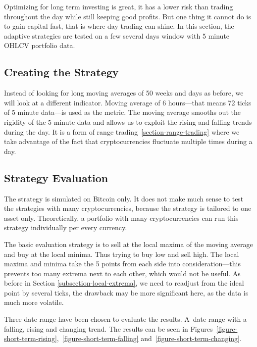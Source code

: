 Optimizing for long term investing is great, it has a lower risk than trading throughout the day while still keeping good profits. But one thing it cannot do is to gain capital fast, that is where day trading can shine. In this section, the adaptive strategies are tested on a few several days window with 5 minute OHLCV portfolio data.

\subsection*{Creating the Strategy}
Instead of looking for long moving averages of 50 weeks and days as before, we will look at a different indicator. Moving average of 6 hours---that means 72 ticks of 5 minute data---is used as the metric. The moving average smooths out the rigidity of the 5-minute data and allows us to exploit the rising and falling trends during the day. It is a form of range trading~\ref{section-range-trading} where we take advantage of the fact that cryptocurrencies fluctuate multiple times during a day.

\subsection*{Strategy Evaluation}
The strategy is simulated on Bitcoin only. It does not make much sense to test the strategies with many cryptocurrencies, because the strategy is tailored to one asset only. Theoretically, a portfolio with many cryptocurrencies can run this strategy individually per every currency.

The basic evaluation strategy is to sell at the local maxima of the moving average and buy at the local minima. Thus trying to buy low and sell high. The local maxima and minima take the 5 points from each side into consideration---this prevents too many extrema next to each other, which would not be useful. As before in Section \ref{subsection-local-extrema}, we need to readjust from the ideal point by several ticks, the drawback may be more significant here, as the data is much more volatile.

Three date range have been chosen to evaluate the results. A~date range with a falling, rising and changing trend. The results can be seen in Figures~\ref{figure-short-term-rising},~\ref{figure-short-term-falling} and~\ref{figure-short-term-changing}.


